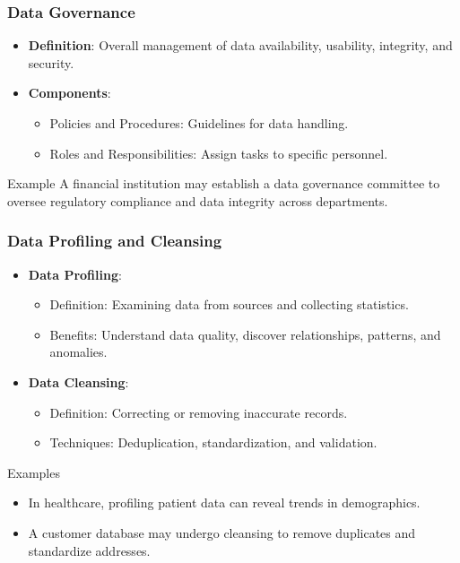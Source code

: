 \documentclass{beamer}
\begin{document}
\begin{frame}[fragile]
    \frametitle{Data Governance}
    \begin{itemize}
        \item \textbf{Definition}: Overall management of data availability, usability, integrity, and security.
        \item \textbf{Components}:
        \begin{itemize}
            \item Policies and Procedures: Guidelines for data handling.
            \item Roles and Responsibilities: Assign tasks to specific personnel.
        \end{itemize}
    \end{itemize}
    \begin{block}{Example}
        A financial institution may establish a data governance committee 
        to oversee regulatory compliance and data integrity across departments.
    \end{block}
\end{frame}

\begin{frame}[fragile]
    \frametitle{Data Profiling and Cleansing}
    \begin{itemize}
        \item \textbf{Data Profiling}:
        \begin{itemize}
            \item Definition: Examining data from sources and collecting statistics.
            \item Benefits: Understand data quality, discover relationships, patterns, and anomalies.
        \end{itemize}
        \item \textbf{Data Cleansing}:
        \begin{itemize}
            \item Definition: Correcting or removing inaccurate records.
            \item Techniques: Deduplication, standardization, and validation.
        \end{itemize}
    \end{itemize}
    \begin{block}{Examples}
        \begin{itemize}
            \item In healthcare, profiling patient data can reveal trends in demographics.
            \item A customer database may undergo cleansing to remove duplicates and standardize addresses.
        \end{itemize}
    \end{block}
\end{frame}
\end{document}
